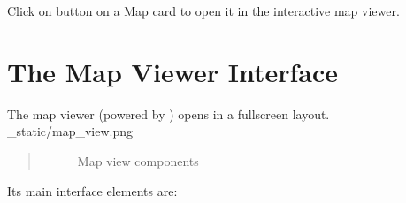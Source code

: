 \documentclass[letterpaper,10pt,english]{sphinxmanual}
\begin{document}
\sphinxAtStartPar
Click on  button on a Map card to open it in the interactive map viewer.


\section{The Map Viewer Interface}
\label{\detokenize{04_exploring_maps:the-map-viewer-interface}}\label{\detokenize{04_exploring_maps:map-viewer}}
\sphinxAtStartPar
The map viewer (powered by ) opens in a full\sphinxhyphen{}screen layout.
\_static/map\_view.png
\begin{quote}

\begin{figure}[htbp]
\centering
\capstart

\noindent{}
\caption{Map view components}\label{\detokenize{04_exploring_maps:id2}}\end{figure}
\end{quote}

\sphinxAtStartPar
Its main interface elements are:
\end{document}
